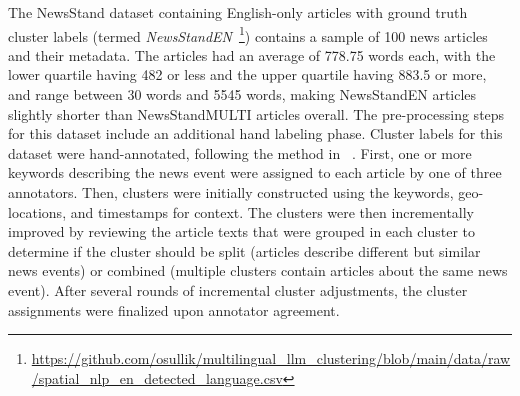 The NewsStand dataset containing English-only articles with ground truth cluster labels (termed \emph{NewsStandEN}~\footnote{\url{https://github.com/osullik/multilingual_llm_clustering/blob/main/data/raw/spatial_nlp_en_detected_language.csv}}) contains a sample of 100 news articles and their metadata.
The articles had an average of 778.75 words each, with the lower quartile having 482 or less and the upper quartile having 883.5 or more, and range between 30 words and 5545 words, making NewsStandEN articles slightly shorter than NewsStandMULTI articles overall.
The pre-processing steps for this dataset include an additional hand labeling phase.
Cluster labels for this dataset were hand-annotated, following the method in \citeauthor{Zhang2023}~\cite{Zhang2023}.
First, one or more keywords describing the news event were assigned to each article by one of three annotators.
Then, clusters were initially constructed using the keywords, geo-locations, and timestamps for context.
The clusters were then incrementally improved by reviewing the article texts that were grouped in each cluster to determine if the cluster should be split (articles describe different but similar news events) or combined (multiple clusters contain articles about the same news event).
After several rounds of incremental cluster adjustments, the cluster assignments were finalized upon annotator agreement.
